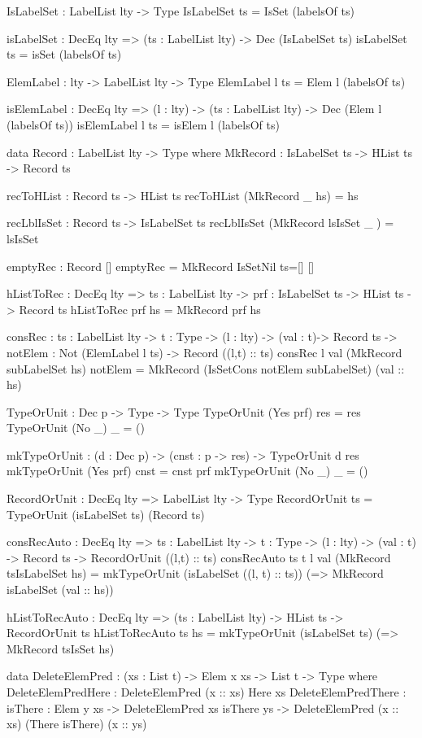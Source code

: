 \begin{code}
IsLabelSet : LabelList lty -> Type
IsLabelSet ts = IsSet (labelsOf ts)  

isLabelSet : DecEq lty => (ts : LabelList lty) -> Dec (IsLabelSet ts)
isLabelSet ts = isSet (labelsOf ts)

ElemLabel : lty -> LabelList lty -> Type
ElemLabel l ts = Elem l (labelsOf ts)

isElemLabel : DecEq lty => (l : lty) -> (ts : LabelList lty) -> 
  Dec (Elem l (labelsOf ts))
isElemLabel l ts = isElem l (labelsOf ts)

data Record : LabelList lty -> Type where
  MkRecord : IsLabelSet ts -> HList ts -> Record ts
       
recToHList : Record ts -> HList ts
recToHList (MkRecord _ hs) = hs

recLblIsSet : Record ts -> IsLabelSet ts
recLblIsSet (MkRecord lsIsSet _ ) = lsIsSet       
             
emptyRec : Record []
emptyRec = MkRecord IsSetNil {ts=[]} [] 
        
hListToRec : DecEq lty => {ts : LabelList lty} -> 
  {prf : IsLabelSet ts} -> HList ts -> Record ts
hListToRec {prf} hs = MkRecord prf hs

consRec : {ts : LabelList lty} -> {t : Type} -> 
  (l : lty) -> (val : t)->  Record ts -> 
  {notElem : Not (ElemLabel l ts)} -> Record ((l,t) :: ts)
consRec l val (MkRecord subLabelSet hs) {notElem} = 
  MkRecord (IsSetCons notElem subLabelSet) (val :: hs)

TypeOrUnit : Dec p -> Type -> Type
TypeOrUnit (Yes prf) res = res
TypeOrUnit (No _) _ = ()

mkTypeOrUnit : (d : Dec p) -> (cnst : p -> res) -> TypeOrUnit d res
mkTypeOrUnit (Yes prf) cnst = cnst prf
mkTypeOrUnit (No _) _ = ()

RecordOrUnit : DecEq lty => LabelList lty -> Type
RecordOrUnit ts = TypeOrUnit (isLabelSet ts) (Record ts)
     
consRecAuto : DecEq lty => {ts : LabelList lty} -> {t : Type} -> 
  (l : lty) -> (val : t) -> Record ts -> 
  RecordOrUnit ((l,t) :: ts)
consRecAuto {ts} {t} l val (MkRecord tsIsLabelSet hs) = 
  mkTypeOrUnit (isLabelSet ((l, t) :: ts)) 
    (\isLabelSet => MkRecord isLabelSet (val :: hs))
    
hListToRecAuto : DecEq lty => (ts : LabelList lty) -> HList ts -> 
  RecordOrUnit ts
hListToRecAuto ts hs = mkTypeOrUnit (isLabelSet ts) 
  (\tsIsSet => MkRecord tsIsSet hs)       
        
data DeleteElemPred : (xs : List t) -> Elem x xs -> List t -> Type where
  DeleteElemPredHere : DeleteElemPred (x :: xs) Here xs
  DeleteElemPredThere : {isThere : Elem y xs} -> 
    DeleteElemPred xs isThere ys -> 
    DeleteElemPred (x :: xs) (There isThere) (x :: ys)


\end{code}

